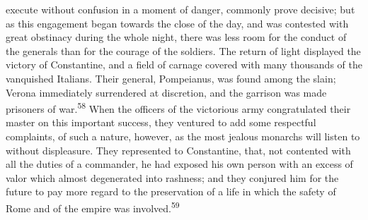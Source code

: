 execute without confusion in a moment of danger, commonly prove
decisive; but as this engagement began towards the close of the
day, and was contested with great obstinacy during the whole
night, there was less room for the conduct of the generals than
for the courage of the soldiers. The return of light displayed
the victory of Constantine, and a field of carnage covered with
many thousands of the vanquished Italians. Their general,
Pompeianus, was found among the slain; Verona immediately
surrendered at discretion, and the garrison was made prisoners of
war.\textsuperscript{58} When the officers of the victorious army congratulated
their master on this important success, they ventured to add some
respectful complaints, of such a nature, however, as the most
jealous monarchs will listen to without displeasure. They
represented to Constantine, that, not contented with all the
duties of a commander, he had exposed his own person with an
excess of valor which almost degenerated into rashness; and they
conjured him for the future to pay more regard to the
preservation of a life in which the safety of Rome and of the
empire was involved.\textsuperscript{59}




